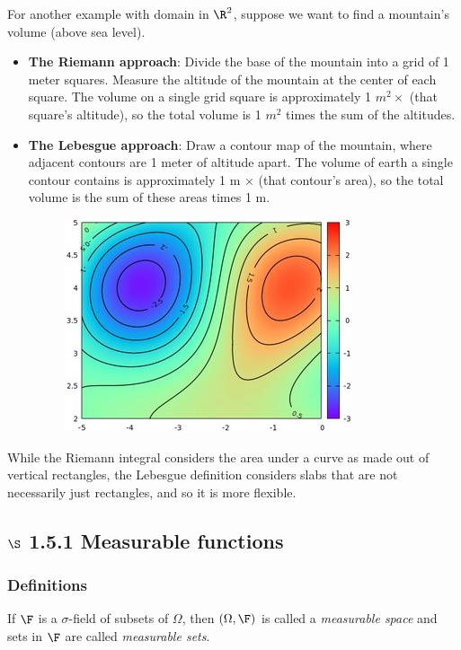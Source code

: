 \documentclass{article} %
\begin{document}
For another example with domain in $\R^2$, suppose we want to find a mountain's volume (above sea level).

\begin{itemize}
\item \textbf{The Riemann approach}: Divide the base of the mountain into a grid of 1 meter squares. Measure the altitude of the mountain at the center of each square. The volume on a single grid square is approximately 1 $m^2 \times$  (that square's altitude), so the total volume is 1 $m^2$ times the sum of the altitudes.
\item \textbf{The Lebesgue approach}: Draw a contour map of the mountain, where adjacent contours are 1 meter of altitude apart. The volume of earth a single contour contains is approximately 1 m $\times$ (that contour's area), so the total volume is the sum of these areas times 1 m.

\begin{figure}[H]
\centering 
\includegraphics[width=.5\textwidth]{images/contour_plot}
\end{figure}
\end{itemize}

While the Riemann integral considers the area under a curve as made out of vertical rectangles, the Lebesgue definition considers slabs that are not necessarily just rectangles, and so it is more flexible. 



\subsection{$\S$ 1.5.1 Measurable functions}

\subsubsection{Definitions}

\begin{definition}
If $\F$ is a $\sigma$-field of subsets of $\Omega$, then $(\Omega, \F)$ is called a \textit{measurable space} and sets in $\F$ are called \textit{measurable sets}.
\label{def:measurable_space_and_measurable_sets}	
\end{definition}
\end{document}
